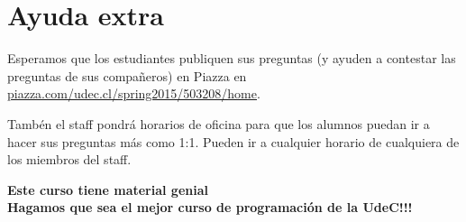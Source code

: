 \documentclass[11pt]{article}
\begin{document}
\section{Ayuda extra}
\label{sec:extrahelp}

Esperamos que los estudiantes publiquen sus preguntas (y ayuden a
contestar las preguntas de sus compa\~neros) en Piazza en
\url{piazza.com/udec.cl/spring2015/503208/home}.

Tamb\'en el staff pondr\'a horarios de oficina para que los alumnos puedan
ir a hacer sus preguntas m\'as como 1:1. Pueden ir a cualquier horario
de cualquiera de los miembros del staff.



\begin{center}
{\huge\bf Este curso tiene material genial}\\
{\huge\bf Hagamos que sea el mejor curso de programaci\'on de la UdeC!!!}
\end{center}
\end{document}
